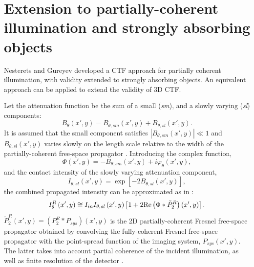 \documentclass[twocolumn, switch]{article} %
\begin{document}
\section{Extension to partially-coherent illumination and strongly absorbing objects} \label{s3:derivation_3}

Nesterets and Gureyev \cite{Nesterets2016PartiallyApproximation} developed a CTF approach for partially coherent illumination, with validity extended to strongly absorbing objects. An equivalent approach can be applied to extend the validity of 3D CTF.

Let the attenuation function be the sum of a small (\textit{sm}), and a slowly varying (\textit{sl}) components:
\begin{equation}
    \label{eq3:attenuation_sm_sl}
    {B_\theta }(x',y) = {B_{\theta ,sm}}(x',y) + {B_{\theta ,sl}}(x',y).
\end{equation}
It is assumed that the small component satisfies $\left| {{B_{\theta ,sm}}(x',y)} \right| \ll 1$ and   ${B_{\theta ,sl}}(x',y)$ varies slowly on the length scale relative to the width of the partially-coherent free-space propagator \cite{Nesterets2016PartiallyApproximation}. Introducing the complex function,
\begin{equation}
    \label{eq3:complex_refraction_sm}
    \Phi (x',y) =  - {B_{\theta ,sm}}(x',y) + i{\varphi _\theta }(x',y),
\end{equation}
and the contact intensity of the slowly varying attenuation component,
\begin{equation}
    \label{eq3:intensity_sl}
    {I_{\theta ,sl}}\left( {x',y} \right) = \exp \left[ { - 2{B_{\theta ,sl}}(x',y)} \right],
\end{equation}
the combined propagated intensity can be approximated as in \cite{Nesterets2016PartiallyApproximation}:
\begin{equation}
    \label{eq3:intensity_sl_sm}
    I_\theta ^R\left( {x',y} \right) \cong {I_{in}}{I_{\theta ,sl}}\left( {x',y} \right)\left[ {1 + 2{\mathop{\rm Re}\nolimits} \left( {\Phi  * \tilde P_2^R} \right)\left( {x',y} \right)} \right].
\end{equation}
$\tilde P_2^R\left( {x',y} \right) = \left( {P_2^R * {P_{sys}}} \right)\left( {x',y} \right)$ is the 2D partially-coherent Fresnel free-space propagator obtained by convolving the fully-coherent Fresnel free-space propagator with the point-spread function of the imaging system, ${P_{sys}}\left( {x',y} \right)$. The latter takes into account partial coherence of the incident illumination, as well as finite resolution of the detector \cite{Nesterets2016PartiallyApproximation}.
\end{document}
